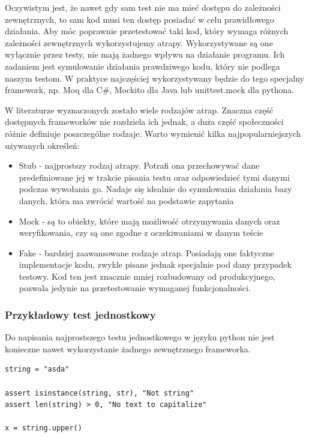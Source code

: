 Oczywistym jest, że nawet gdy sam test nie ma mieć dostępu do zależności zewnętrznych, to sam kod musi ten dostęp posiadać w celu prawidłowego działania. Aby móc poprawnie przetestować taki kod, który wymaga różnych zależności zewnętrznych wykorzystujemy atrapy. Wykorzystywane są one wyłącznie przez testy, nie mają żadnego wpływu na działanie programu. Ich zadaniem jest symulowanie działania prawdziwego kodu, który nie podlega naszym testom. W praktyce najczęściej wykorzystywany będzie do tego specjalny framework, np. Moq dla C\#, Mockito dla Java lub unittest.mock dla pythona. 

W literaturze wyznaczonych zostało wiele rodzajów atrap. Znaczna część dostępnych frameworków nie rozdziela ich jednak, a duża część społeczności różnie definiuje poszczególne rodzaje. Warto wymienić kilka najpopularniejszych używanych określeń: 
\begin{itemize}
    \item Stub - najprostszy rodzaj atrapy. Potrafi ona przechowywać dane predefiniowane jej w trakcie pisania testu oraz odpowiedzieć tymi danymi podczas wywołania go. Nadaje się idealnie do symulowania działania bazy danych, która ma zwrócić wartość na podstawie zapytania
    \item Mock - są to obiekty, które mają możliwość otrzymywania danych oraz weryfikowania, czy są one zgodne z oczekiwaniami w danym teście 
    \item Fake - bardziej zaawansowane rodzaje atrap. Posiadają one faktyczne implementacje kodu, zwykle pisane jednak specjalnie pod dany przypadek testowy. Kod ten jest znacznie mniej rozbudowany od produkcyjnego, pozwala jedynie na przetestowanie wymaganej funkcjonalności. 
\end{itemize}

\subsubsection{Przykładowy test jednostkowy}
Do napisania najprostszego testu jednostkowego w języku python nie jest konieczne nawet wykorzystanie żadnego zewnętrznego frameworka. 

\begin{lstlisting}[caption={Test jednostkowy w języku Python}]
string = "asda"

assert isinstance(string, str), "Not string"
assert len(string) > 0, "No text to capitalize"

x = string.upper()
\end{lstlisting}

